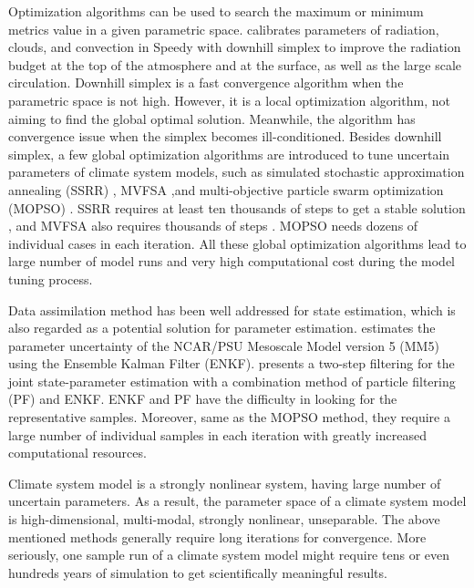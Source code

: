 \documentclass[gmd, manuscript]{copernicus}
\begin{document}
Optimization algorithms can be used to search the maximum or minimum metrics value in a given parametric space. \cite{severijns2005optimizing} calibrates parameters of radiation, clouds, and convection in Speedy with downhill simplex \citep{press1992numerical, nelder1965simplex} to improve the radiation budget at the top of the atmosphere and at the surface, as well as the large scale circulation. Downhill simplex is a fast convergence algorithm when the parametric space is not high. However, it is a local optimization algorithm, not aiming to find the global optimal solution. Meanwhile, the algorithm has convergence issue when the simplex becomes ill-conditioned. Besides downhill simplex, a few global optimization algorithms are introduced to tune uncertain parameters of climate system models, such as simulated stochastic approximation annealing (SSRR) \cite{yang2013uncertainty}, MVFSA \cite{yang2014calibration} ,and multi-objective particle swarm optimization (MOPSO) \cite{gill2006multiobjective} . SSRR requires at least ten thousands of steps to get a stable solution \citep{liang2013simulated}, and MVFSA also requires thousands of steps \citep{jackson2004efficient}. MOPSO needs dozens of individual cases in each iteration. All these global optimization algorithms lead to large number of model runs and very high computational cost during the model tuning process.


Data assimilation method has been well addressed for state estimation, which is also regarded as a potential solution for parameter estimation. \cite{aksoy2006ensemble} estimates the parameter uncertainty of the NCAR/PSU Mesoscale
Model version 5 (MM5) \citep{haagenson1994penn} using the Ensemble Kalman Filter (ENKF). \cite{santiti2013simulated} presents a two-step filtering for the joint state-parameter estimation with a combination method of particle filtering (PF) and ENKF.  ENKF and PF have the difficulty in looking for the representative samples. Moreover, same as the MOPSO method, they require a large number of individual samples in each iteration with greatly increased computational resources.


Climate system model is a strongly nonlinear system, having large number of uncertain parameters. As a result, the parameter space of a climate system model is high-dimensional, multi-modal, strongly nonlinear, unseparable. The above mentioned methods generally require long iterations for convergence. More seriously, one sample run of a climate system model might require tens or even hundreds years of simulation to get scientifically meaningful results.
\end{document}
